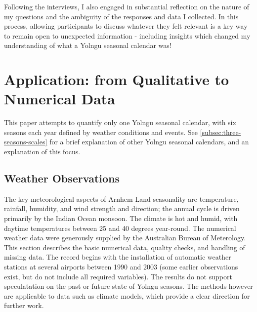 Following the interviews, I also engaged in substantial reflection on the nature
of my questions and the ambiguity of the responses and data I collected.
In this process, allowing participants to discuss whatever they felt relevant
is a key way to remain open to unexpected information - including insights
which changed my understanding of what a Yolngu seasonal calendar was!



\section{Application: from Qualitative to Numerical Data}

This paper attempts to quantify only one Yolngu seasonal calendar, with six
seasons each year defined by weather conditions and events.  See
\cref{subsec:three-seasons-scales} for a brief explanation of other
Yolngu seasonal calendars, and an explanation of this focus.

\subsection{Weather Observations}

The key meteorological aspects of Arnhem Land seasonality are temperature,
rainfall, humidity, and wind strength and direction; the annual
cycle is driven primarily by the Indian Ocean monsoon.  The climate is hot and
humid, with daytime temperatures between 25 and 40 degrees year-round.
%
The numerical weather data were generously supplied by the Australian
Bureau of Meterology.  This section describes the basic numerical data,
quality checks, and handling of missing data.
The record begins with the installation of automatic weather stations
at several airports between 1990 and 2003  (some earlier observations exist,
but do not include all required variables).  The results do not support
speculatation on the past or future state of Yolngu seasons.  The methods
however are applicable to data such as climate models, which provide
a clear direction for further work.

